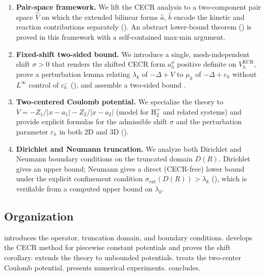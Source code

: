 \documentclass[11pt]{article}
\theoremstyle{plain}
\theoremstyle{definition}
\theoremstyle{remark}
\newcommand{\ECR}{\mathrm{ECR}}
\begin{document}
\begin{enumerate}[label=(\roman*)]

\item \textbf{Pair-space framework.}
We lift the CECR analysis to a two-component pair space
$\widehat V$ on which the extended bilinear forms $\widehat a$,
$\widehat b$ encode the kinetic and reaction contributions
separately ().  An abstract lower-bound
theorem () is proved in this framework with a
self-contained max-min argument.
\item \textbf{Fixed-shift two-sided bound.}
We introduce a single, mesh-independent shift $\sigma>0$ that
renders the shifted CECR form $a_h^\sigma$ positive definite on
$V_h^{\ECR}$, prove a perturbation
lemma relating $\lambda_k$ of $-\Delta+V$ to $\mu_k$ of $-\Delta+c_h$
without $L^\infty$ control of $c_h^-$ (),
and assemble a two-sided bound .

\item \textbf{Two-centered Coulomb potential.}
We specialize the theory to $V = -Z_1/|x-a_1| - Z_2/|x-a_2|$
(model for $\mathrm{H}_2^+$ and related systems) and provide explicit
formulas for the admissible shift $\sigma$ and the perturbation
parameter $\varepsilon_h$ in both 2D and 3D
().

\item \textbf{Dirichlet and Neumann truncation.}
We analyze both Dirichlet and Neumann boundary conditions on the
truncated domain $D(R)$.  Dirichlet gives an upper bound; Neumann
gives a direct (CECR-free) lower bound under the explicit
confinement condition $\sigma_{\mathrm{ext}}(D(R)) > \lambda_k$
(), which is verifiable from a computed
upper bound on $\lambda_k$.


\end{enumerate}

\subsection*{Organization}

 introduces the operator, truncation domain, and
boundary conditions.
 develops the CECR method for piecewise constant
potentials and proves the shift corollary.
 extends the theory to unbounded potentials.
 treats the two-center Coulomb potential.
 presents numerical experiments.
 concludes.
\end{document}
